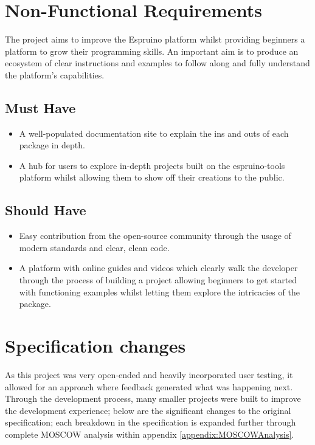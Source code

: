\documentclass{l4proj}
\begin{document}
\section{Non-Functional Requirements}
\text The project aims to improve the Espruino platform whilst providing beginners a platform to grow their programming skills. An important aim is to produce an ecosystem of clear instructions and examples to follow along and fully understand the platform's capabilities.
\subsection{Must Have}
\begin{itemize}
    \item A well-populated documentation site to explain the ins and outs of each package in depth.
    \item A hub for users to explore in-depth projects built on the espruino-tools platform whilst allowing them to show off their creations to the public.
    
\end{itemize} 
\subsection{Should Have}
\begin{itemize}
    \item Easy contribution from the open-source community through the usage of modern standards and clear, clean code.
    \item A platform with online guides and videos which clearly walk the developer through the process of building a project allowing beginners to get started with functioning examples whilst letting them explore the intricacies of the package.
\end{itemize} 

\section{Specification changes}

\text As this project was very open-ended and heavily incorporated user testing, it allowed for an approach where feedback generated what was happening next. Through the development process, many smaller projects were built to improve the development experience; below are the significant changes to the original specification; each breakdown in the specification is expanded further through complete MOSCOW analysis within appendix \ref{appendix:MOSCOWAnalysis}.
\end{document}
